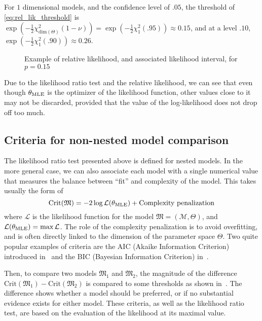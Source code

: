 \documentclass[../../Main_ManuscritThese.tex]{subfiles}
\newcommand\imgpath{/home/victor/acadwriting/Manuscrit/Text/Chapter2/img/}
\begin{document}
For $1$ dimensional models, and the confidence level of $.05$, the threshold of \cref{eq:rel_lik_threshold} is $\exp\left(-\frac{1}{2}\chi^2_{\mathrm{dim}(\Theta)}(1-\nu)\right) = \exp\left(-\frac{1}{2}\chi^2_{1}(.95)\right) \approx 0.15$, and at a level $.10$, $\exp\left(-\frac{1}{2}\chi^2_{1}(.90)\right) \approx 0.26$.

\begin{figure}[ht]
  \centering 
  
  \caption{\label{fig:relative_likelihood} Example of relative likelihood, and associated likelihood interval, for $p=0.15$}
\end{figure}

Due to the likelihood ratio test and the relative likelihood, we can see that even though ${\theta}_{\mathrm{MLE}}$ is the optimizer of the likelihood function, other values close to it may not be discarded, provided that the value of the log-likelihood does not drop off too much.

\subsection{Criteria for non-nested model comparison}
\label{sec:criteria_AIC}
The likelihood ratio test presented above is defined for nested models. In the more general case, we can also associate each model with a single numerical value that measures the balance between ``fit'' and complexity of the model. This takes usually the form of
\begin{equation}
  \mathrm{Crit}(\mathfrak{M})=-2 \log \mathcal{L} ({\theta}_{\mathrm{MLE}}) + \text{Complexity penalization}
\end{equation}
where $\mathcal{L}$ is the likelihood function for the model $\mathfrak{M} = (\mathcal{M},\Theta)$, and $\mathcal{L}({\theta}_{\mathrm{MLE}}) = \max \mathcal{L}$. The role of the complexity penalization is to avoid overfitting, and is often directly linked to the dimension of the parameter space $\Theta$.
Two quite popular examples of criteria are the AIC (Akaike Information Criterion) introduced in~\cite{akaike_new_1974} and the BIC (Bayesian Information Criterion) in~\cite{schwarz_estimating_1978}.

Then, to compare two models $\mathfrak{M}_1$ and $\mathfrak{M}_2$, the magnitude of the difference $\mathrm{Crit}(\mathfrak{M}_1) - \mathrm{Crit}(\mathfrak{M}_2)$ is compared to some thresholds as shown in~\cite{burnham_multimodel_2004}.
The difference shows whether a model should be preferred, or if no substantial evidence exists for either model.
These criteria, as well as the likelihood ratio test, are based on the evaluation of the likelihood at its maximal value.
\end{document}
